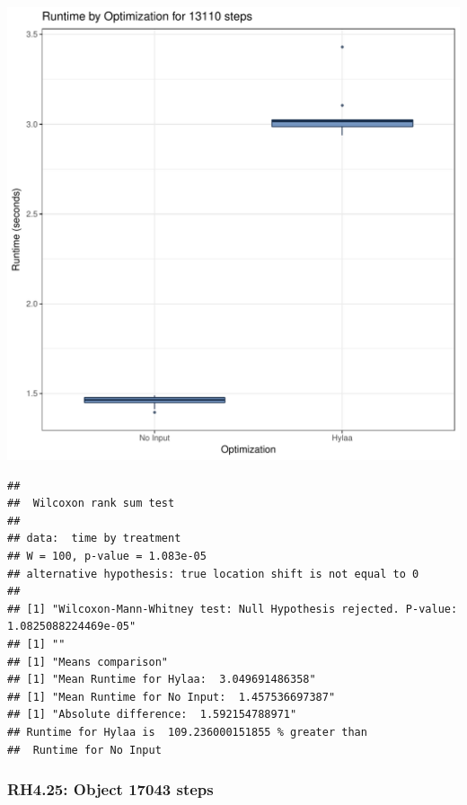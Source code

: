 \documentclass{article}\usepackage[]{graphicx}\usepackage[]{color}
\makeatletter
\def\maxwidth{ %
  \ifdim\Gin@nat@width>\linewidth
    \linewidth
  \else
    \Gin@nat@width
  \fi
}
\newenvironment{kframe}{%
 \def\at@end@of@kframe{}%
 \ifinner\ifhmode%
  \def\at@end@of@kframe{\end{minipage}}%
  \begin{minipage}{\columnwidth}%
 \fi\fi%
 \def\FrameCommand##1{\hskip\@totalleftmargin \hskip-\fboxsep
 \colorbox{shadecolor}{##1}\hskip-\fboxsep
     \hskip-\linewidth \hskip-\@totalleftmargin \hskip\columnwidth}%
 \MakeFramed {\advance\hsize-\width
   \@totalleftmargin\z@ \linewidth\hsize
   \@setminipage}}%
 {\par\unskip\endMakeFramed%
 \at@end@of@kframe}
\newenvironment{knitrout}{}{} %
\makeatother
\begin{document}
\begin{knitrout}
\color{fgcolor}
\includegraphics[width=\maxwidth]{figure/RH4_steps13110-1} 
\begin{kframe}\begin{verbatim}
## 
## 	Wilcoxon rank sum test
## 
## data:  time by treatment
## W = 100, p-value = 1.083e-05
## alternative hypothesis: true location shift is not equal to 0
## 
## [1] "Wilcoxon-Mann-Whitney test: Null Hypothesis rejected. P-value: 1.0825088224469e-05"
## [1] ""
## [1] "Means comparison"
## [1] "Mean Runtime for Hylaa:  3.049691486358"
## [1] "Mean Runtime for No Input:  1.457536697387"
## [1] "Absolute difference:  1.592154788971"
## Runtime for Hylaa is  109.236000151855 % greater than 
##  Runtime for No Input
\end{verbatim}
\end{kframe}
\end{knitrout}


\subsubsection{RH4.25: Object 17043 steps}
\end{document}
